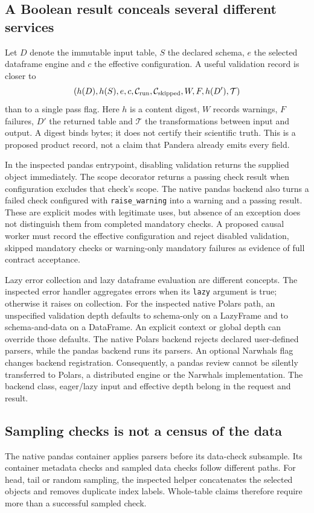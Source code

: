\subsection{A Boolean result conceals several different services}
Let $D$ denote the immutable input table, $S$ the declared schema, $e$ the
selected dataframe engine and $c$ the effective configuration. A useful
validation record is closer to
\begin{equation}
 (h(D),h(S),e,c,\mathcal C_{\rm run},\mathcal C_{\rm skipped},
   W,F,h(D'),\mathcal T)
\end{equation}
than to a single pass flag. Here $h$ is a content digest, $W$ records warnings,
$F$ failures, $D'$ the returned table and $\mathcal T$ the transformations
between input and output. A digest binds bytes; it does not certify their
scientific truth. This is a proposed product record, not a claim that Pandera
already emits every field.

In the inspected pandas entrypoint, disabling validation returns the supplied
object immediately. The scope decorator returns a passing check result when
configuration excludes that check's scope. The native pandas backend also
turns a failed check configured with \texttt{raise\_warning} into a warning
and a passing result. These are explicit modes with legitimate uses, but
absence of an exception does not distinguish them from completed mandatory
checks. A proposed causal worker must record the effective configuration and
reject disabled validation, skipped mandatory checks or warning-only mandatory
failures as evidence of full contract acceptance.~\citep{exec24_pandera_source}

Lazy error collection and lazy dataframe evaluation are different concepts.
The inspected error handler aggregates errors when its \texttt{lazy} argument
is true; otherwise it raises on collection. For the inspected native Polars
path, an unspecified validation depth defaults to schema-only on a LazyFrame
and to schema-and-data on a DataFrame. An explicit context or global depth
can override those defaults. The native Polars backend rejects declared
user-defined parsers, while the pandas backend runs its parsers. An optional
Narwhals flag changes backend registration. Consequently, a pandas review
cannot be silently transferred to Polars, a distributed engine or the
Narwhals implementation. The backend class, eager/lazy input and effective
depth belong in the request and result.~\citep{exec24_pandera_source}

\subsection{Sampling checks is not a census of the data}
The native pandas container applies parsers before its data-check subsample.
Its container metadata checks and sampled data checks follow different paths.
For head, tail or random sampling, the inspected helper concatenates the
selected objects and removes duplicate index labels. Whole-table claims
therefore require more than a successful sampled check.
\citep{exec24_pandera_source}


